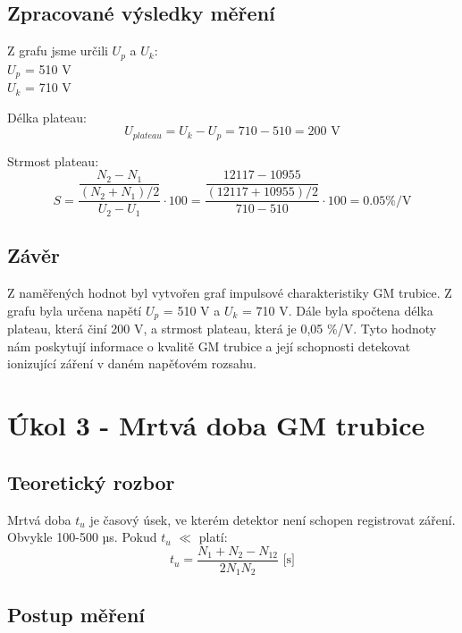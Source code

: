 \documentclass{protokol}
\begin{document}
    \subsection{Zpracované výsledky měření}

    Z grafu jsme určili $U_p$ a $U_k$:
    \\
    $U_p$ = 510 V\\
    $U_k$ = 710 V

    Délka plateau:
    \begin{equation}
        U_{plateau} = U_k - U_p = 710 - 510 = 200 \text{ V}
    \end{equation}

    Strmost plateau:
    \begin{equation}   
        S =  \dfrac{\dfrac{N_2-N_1}{(N_2+N_1)/2}}{U_2-U_1} \cdot 100 = \dfrac{\dfrac{12117-10955}{(12117+10955)/2}}{710-510} \cdot 100 = 0.05  \% / \text{V}
    \end{equation}
    
    \subsection{Závěr}
    Z naměřených hodnot byl vytvořen graf impulsové charakteristiky GM trubice. Z grafu byla určena napětí $U_p$ = 510 V a $U_k$ = 710 V. Dále byla spočtena délka plateau, která činí 200 V, a strmost plateau, která je 0,05 \%/V. Tyto hodnoty nám poskytují informace o kvalitě GM trubice a její schopnosti detekovat ionizující záření v daném napěťovém rozsahu.

\pagebreak

\section{Úkol 3 - Mrtvá doba GM trubice}
    \subsection{Teoretický rozbor}

    Mrtvá doba $t_u$ je časový úsek, ve kterém detektor není schopen registrovat záření. Obvykle 100-500 µs. Pokud $t_u$ $\ll$  platí:
    \begin{equation}   
        t_u =  \dfrac{N_1+N_2-N_{12}}{2N_1N_2}  \text{     [s]}
    \end{equation}

    \subsection{Postup měření}
\end{document}
